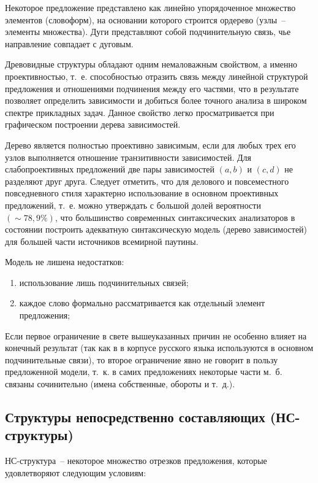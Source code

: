 \documentclass[a4paper,14pt,russian]{extreport}
\begin{document}
Некоторое предложение представлено как линейно упорядоченное множество элементов (словоформ), на основании которого строится ордерево (узлы~-- элементы множества). Дуги представляют собой подчинительную связь, чье направление совпадает с дуговым.

Древовидные структуры обладают одним немаловажным свойством, а именно проективностью, т.~е. способностью отразить связь между линейной структурой предложения и отношениями подчинения между его частями, что в результате позволяет определить зависимости и добиться более точного анализа в широком спектре прикладных задач. Данное свойство легко просматривается при графическом построении дерева зависимостей.

Дерево является полностью проективно зависимым, если для любых трех его узлов выполняется отношение транзитивности зависимостей. Для слабопроективных предложений две пары зависимостей $\left(a, b\right)$ и $\left(c, d\right)$ не разделяют друг друга. Следует отметить, что для делового и повсеместного повседневного стиля характерно использование в основном проективных предложений, т.~е. можно утверждать с большой долей вероятности $\left(\sim78,9\%\right)$, что большинство современных синтаксических анализаторов в состоянии построить адекватную синтаксическую модель (дерево зависимостей) для большей части источников всемирной паутины.

Модель не лишена недостатков:

\begin{enumerate}
\item использование лишь подчинительных связей;
\item каждое слово формально рассматривается как отдельный элемент предложения;
\end{enumerate}

Если первое ограничение в свете вышеуказанных причин не особенно влияет на конечный результат (так как в в корпусе русского языка используются в основном подчинительные связи), то второе ограничение явно не говорит в пользу предложенной модели, т.~к. в самих предложениях некоторые части м.~б. связаны сочинительно (имена собственные, обороты и т.~д.).

\subsection{Структуры непосредственно составляющих (НС-структуры)}

НС-структура~-- некоторое множество отрезков предложения, которые удовлетворяют следующим условиям:
\end{document}
